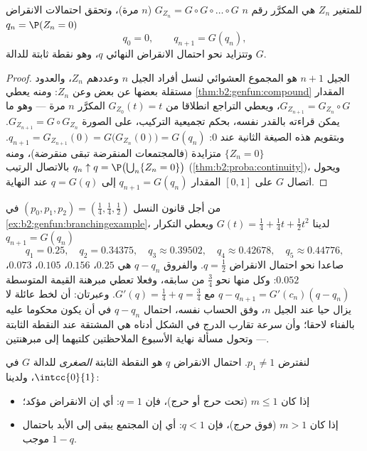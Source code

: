 \begin{proposition}\label{prop:b2:genfun:branching}
 للمتغير $Z_n$ هي المكرَّر رقم $n$ $G_{Z_n} = G \circ G \circ \dots \circ G$
($n$ مرة)، وتحقق احتمالات الانقراض $q_n = \P(Z_n = 0)$
\[
q_0 = 0, \qquad q_{n+1} = G(q_n),
\]
وتتزايد نحو احتمال الانقراض النهائي $q$، وهو نقطة ثابتة للدالة
$G$.
\end{proposition}

\begin{proof}
الجيل $n + 1$ هو المجموع العشوائي لنسل أفراد الجيل $n$ وعددهم
$Z_n$، والعدود مستقلة بعضها عن بعض وعن $Z_n$: ومنه يعطي \cref{thm:b2:genfun:compound}
المقدار $G_{Z_{n+1}} =
G_{Z_n} \circ G$، ويعطي التراجع انطلاقا من $G_{Z_0}(t) = t$ المكرَّر $n$
مرة --- وهو ما يمكن قراءته بالقدر نفسه، بحكم تجميعية التركيب، على
الصورة $G_{Z_{n+1}} = G \circ G_{Z_n}$. وبتقويم هذه الصيغة الثانية عند $0$: $q_{n+1} = G_{Z_{n+1}}(0) =
G\bigl(G_{Z_n}(0)\bigr) = G(q_n)$.
 $\{Z_n = 0\}$ متزايدة (فالمجتمعات المنقرضة تبقى منقرضة)، ومنه
$q_n \uparrow q = \P\bigl(\bigcup_n\{Z_n = 0\}\bigr)$ بالاتصال الرتيب (\cref{thm:b2:proba:continuity})، ويحول اتصال $G$ على $[0, 1]$
المقدار $q_{n+1} = G(q_n)$ إلى $q =
G(q)$ عند النهاية.
\end{proof}

\begin{example}
\label{ex:b2:genfun:cobwebnumerics}
من أجل قانون النسل $(p_0, p_1, p_2) = (\tfrac14,
\tfrac14, \tfrac12)$ في \cref{ex:b2:genfun:branchingexample}، لدينا $G(t) = \tfrac14 + \tfrac14t + \tfrac12t^2$ ويعطي التكرار
$q_{n+1} = G(q_n)$
\[
q_1 = 0.25, \quad q_2 = 0.34375, \quad q_3 \approx 0.39502,
\quad q_4 \approx 0.42678, \quad q_5 \approx 0.44776,
\]
صاعدا نحو احتمال الانقراض $q = \tfrac12$. والفروق $q - q_n$ هي $0.25$، $0.156$،
$0.105$، $0.073$، $0.052$: وكل منها نحو $\tfrac34$ من سابقه، وفعلا تعطي
مبرهنة القيمة المتوسطة $q - q_{n+1} = G'(c_n)(q
- q_n)$ مع $G'(q) = \tfrac14 + q = \tfrac34$. وعبرتان: أن لخط عائلة لا
يزال حيا عند الجيل $n$، وفق الحساب نفسه، احتمال $q - q_n$ في أن
يكون محكوما عليه بالفناء لاحقا؛ وأن سرعة تقارب الدرج في الشكل أدناه
هي المشتقة عند النقطة الثابتة --- وتحول مسألة نهاية الأسبوع الملاحظتين
كلتيهما إلى مبرهنتين.
\end{example}

\begin{theorem}\label{thm:b2:genfun:extinction}
لنفترض $p_1 \neq 1$. احتمال الانقراض $q$ هو النقطة الثابتة
\emph{الصغرى} للدالة $G$ في $\intcc{0}{1}$، ولدينا:
\begin{itemize}
\item إذا كان $m \leq 1$ (تحت حرج أو حرج)، فإن $q = 1$: أي إن الانقراض
مؤكد؛
\item إذا كان $m > 1$ (فوق حرج)، فإن $q < 1$: أي إن المجتمع يبقى إلى
الأبد باحتمال موجب $1 - q$.
\end{itemize}
\end{theorem}

